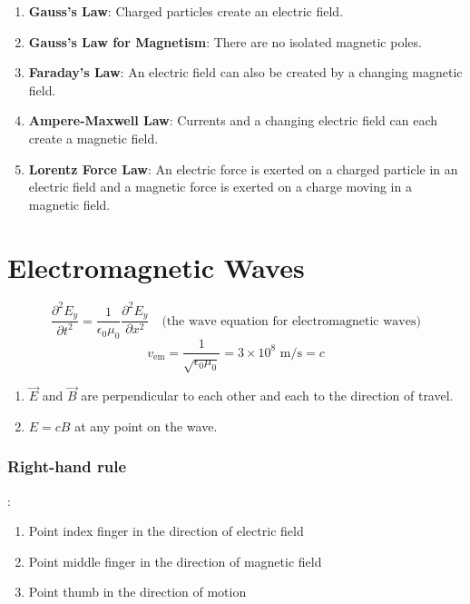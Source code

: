 \documentclass{article}
\begin{document}
\begin{enumerate}
    \item \textbf{Gauss's Law}: Charged particles create an electric field.
    \item \textbf{Gauss's Law for Magnetism}: There are no isolated magnetic poles.
    \item \textbf{Faraday's Law}: An electric field can also be created by a changing magnetic
    field.
    \item \textbf{Ampere-Maxwell Law}: Currents and a changing electric field can each create a
    magnetic field.
    \item \textbf{Lorentz Force Law}: An electric force is exerted on a charged particle in an
    electric field and a magnetic force is exerted on a charge moving in a magnetic field.
\end{enumerate}

\section*{Electromagnetic Waves}
\[\frac{\partial^2 E_y}{\partial t^2}=\frac{1}{\epsilon_0 \mu_0} \frac{\partial^2 E_y}
{\partial x^2}\quad\text{(the wave equation for electromagnetic waves)}\]
\[v_\text{em}=\frac{1}{\sqrt{\epsilon_0 \mu_0}} = 3\times 10^8 \text{ m/s} = c\]

\begin{enumerate}
    \item $\vec{E}$ and $\vec{B}$ are perpendicular to each other and each to the direction of
    travel.
    \item $E=cB$ at any point on the wave.
\end{enumerate}

\subsubsection*{Right-hand rule}:
\begin{enumerate}
    \item Point index finger in the direction of electric field
    \item Point middle finger in the direction of magnetic field
    \item Point thumb in the direction of motion
\end{enumerate}
\end{document}
